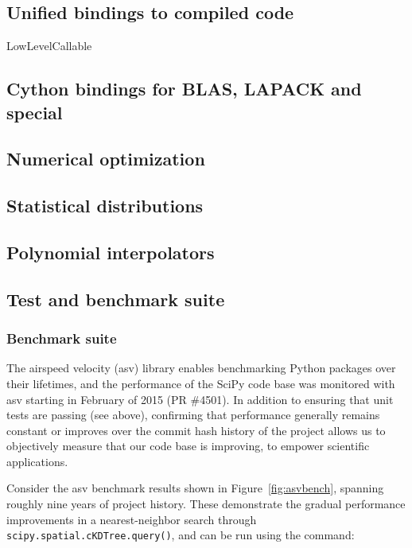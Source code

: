 \documentclass[fleqn,10pt]{wlscirep}
\begin{document}
\subsection*{Unified bindings to compiled code}
LowLevelCallable

\subsection*{Cython bindings for BLAS, LAPACK and special}

\subsection*{Numerical optimization}



\subsection*{Statistical distributions}

\subsection*{Polynomial interpolators}

\subsection*{Test and benchmark suite}

    \subsubsection*{Benchmark suite}

    The airspeed velocity (asv) library enables benchmarking Python packages over their lifetimes, and the performance of the SciPy
    code base was monitored with asv starting in February of 2015 (PR \#4501). In addition to ensuring that unit tests are passing (see above),
    confirming that performance generally remains constant or improves over the commit hash history of the project allows us to objectively
    measure that our code base is improving, to empower scientific applications.

    Consider the asv benchmark results shown in Figure~\ref{fig:asvbench}, spanning roughly nine years of project history. These demonstrate the gradual performance
    improvements in a nearest-neighbor search through \texttt{scipy.spatial.cKDTree.query()}, and can be run using the command:
\end{document}
